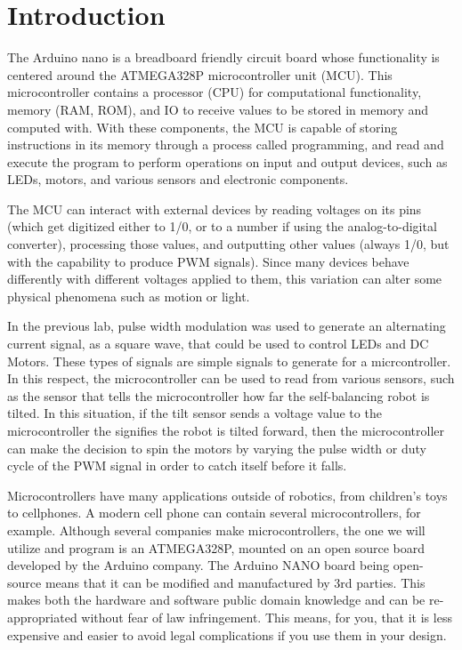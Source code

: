 \documentclass[12pt]{article}
\begin{document}
\MakeLabTop

\section{Introduction}

The Arduino nano is a breadboard friendly circuit board whose functionality is centered around the ATMEGA328P microcontroller unit (MCU). This microcontroller contains a processor (CPU) for computational functionality, memory (RAM, ROM), and IO to receive values to be stored in memory and computed with. With these components, the MCU is capable of storing instructions in its memory through a process called programming, and read and execute the program to perform operations on input and output devices, such as LEDs, motors, and various sensors and electronic components. 

The MCU can interact with external devices by reading voltages on its pins (which get digitized either to 1/0, or to a number if using the analog-to-digital converter), processing those values, and outputting other values (always 1/0, but with the capability to produce PWM signals). Since many devices behave differently with different voltages applied to them, this variation can alter some physical phenomena such as motion or light.

In the previous lab, pulse width modulation was used to generate an alternating current signal, as a square wave, that could be used to control LEDs and DC Motors. These types of signals are simple signals to generate for a micrcontroller. In this respect, the microcontroller can be used to read from various sensors, such as the sensor that tells the microcontroller how far the self-balancing robot is tilted. In this situation, if the tilt sensor sends a voltage value to the microcontroller the signifies the robot is tilted forward, then the microcontroller can make the decision to spin the motors by varying the pulse width or duty cycle of the PWM signal in order to catch itself before it falls. 

Microcontrollers have many applications outside of robotics, from children's toys to cellphones. A modern cell phone can contain several microcontrollers, for example. Although several companies make microcontrollers, the one we will utilize and program is an ATMEGA328P, mounted on an open source board developed by the Arduino company. The Arduino NANO board being open-source means that it can be modified and manufactured by 3rd parties. This makes both the hardware and software public domain knowledge and can be re-appropriated without fear of law infringement. This means, for you, that it is less expensive and easier to avoid legal complications if you use them in your design.
\end{document}
